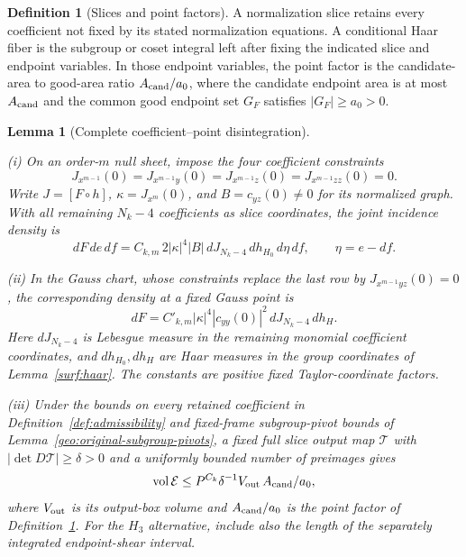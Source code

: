 \documentclass[11pt]{amsart}
\newtheorem{lemma}[theorem]{Lemma}
\theoremstyle{definition}
\newtheorem{definition}{Definition}[section]
\theoremstyle{remark}
\numberwithin{equation}{section}
\begin{document}
\begin{definition}[Slices and point factors]\label{def:point-factor}
A normalization slice retains every coefficient not fixed by its stated normalization equations. A conditional Haar fiber is the subgroup or coset integral left after fixing the indicated slice and endpoint variables. In those endpoint variables, the point factor is the candidate-area to good-area ratio $A_{\rm cand}/a_0$, where the candidate endpoint area is at most $A_{\rm cand}$ and the common good endpoint set $G_F$ satisfies $|G_F|\ge a_0>0$.
\end{definition}
\begin{lemma}[Complete coefficient--point disintegration]\label{surf:null-density}

\leavevmode\noindent\textup{(i)} On an order-$m$ null sheet, impose the four coefficient constraints
\[
J_{x^{m-1}}(0)=J_{x^{m-1}y}(0)=J_{x^{m-1}z}(0)=J_{x^{m-1}zz}(0)=0.
\]
Write $J=[F\circ h]$, $\kappa=J_{x^m}(0)$, and $B=c_{yz}(0)\ne0$ for its normalized graph. With all remaining $N_k-4$ coefficients as slice coordinates, the joint incidence density is
\begin{equation}\label{surf:null-density-eq}
dF\,de\,df=C_{k,m}\,2|\kappa|^4|B|\,dJ_{N_k-4}\,dh_{H_0}\,d\eta\,df,\qquad \eta=e-df.
\end{equation}

\noindent\textup{(ii)} In the Gauss chart, whose constraints replace the last row by $J_{x^{m-1}yz}(0)=0$, the corresponding density at a fixed Gauss point is
\begin{equation}\label{surf:gauss-density}
dF=C'_{k,m}|\kappa|^4|c_{yy}(0)|^2\,dJ_{N_k-4}\,dh_H.
\end{equation}
Here $dJ_{N_k-4}$ is Lebesgue measure in the remaining monomial coefficient coordinates, and $dh_{H_0},dh_H$ are Haar measures in the group coordinates of Lemma~\ref{surf:haar}. The constants are positive fixed Taylor-coordinate factors.

\noindent\textup{(iii)} Under the bounds on every retained coefficient in Definition~\ref{def:admissibility} and fixed-frame subgroup-pivot bounds of Lemma~\ref{geo:original-subgroup-pivots}, a fixed full slice output map $\mathcal T$ with $|\det D\mathcal T|\ge\delta>0$ and a uniformly bounded number of preimages gives
\[
\operatorname{vol}\mathcal E\le P^{C_k}\delta^{-1}V_{\rm out}\,A_{\rm cand}/a_0,
\]
where $V_{\rm out}$ is its output-box volume and $A_{\rm cand}/a_0$ is the point factor of Definition~\ref{def:point-factor}. For the $H_3$ alternative, include also the length of the separately integrated endpoint-shear interval.
\end{lemma}
\end{document}
